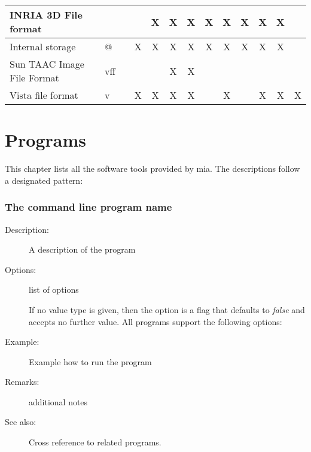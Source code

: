 \documentclass[english, 10pt, a4paper,headsepline,openany]{book}
\newcommand{\has}{\cellcolor[gray]{0.5}X}
\begin{document}
\begin{table}[h]
\begin{tabular}{lll|c|c|c|c|c|c|c|c|c|c}
\hline 
INRIA 3D File format      &     &            &   &\has &\has &\has &\has &\has &\has &\has&\has&   \\
\hline 
Internal storage          & @   &            &\has& \has&\has &\has &\has &\has &\has &\has&\has&   \\
\hline 
Sun TAAC Image File Format& vff &            &   &    &\has &\has &    &    &    &   &   &   \\
\hline 
Vista file format         & v   &            &\has&\has &\has &\has &    &\has &    &\has&\has&\has\\
\hline 
\end{tabular}
\end{table}



%

\chapter{Programs}
\label{ch:prog}


This chapter lists all the software tools provided by mia. 
The descriptions follow a designated pattern: 

\subsection*{The command line program name}
\begin{description}
\item [Description:]A description of the program
\item [Options:] list of options

\noindent 
{}

\noindent 
If no value type is given, then the option is a flag that defaults to \emph{false} and accepts no 
     further value. 
All programs support the following options: 


\item [Example:] Example how to run the program 

\item [Remarks:] additional notes
\item [See also:] Cross reference to related programs. 
\end{description}
\end{document}
